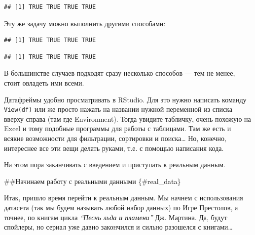 \documentclass[]{book}
\newenvironment{Shaded}{\begin{snugshade}}{\end{snugshade}}
\newcommand{\KeywordTok}[1]{\textcolor[rgb]{0.13,0.29,0.53}{\textbf{#1}}}
\newcommand{\NormalTok}[1]{#1}
\newcommand{\OperatorTok}[1]{\textcolor[rgb]{0.81,0.36,0.00}{\textbf{#1}}}
\newcommand{\StringTok}[1]{\textcolor[rgb]{0.31,0.60,0.02}{#1}}
\begin{document}
\begin{verbatim}
## [1] TRUE TRUE TRUE TRUE
\end{verbatim}

Эту же задачу можно выполнить другими способами:

\begin{Shaded}
\end{Shaded}

\begin{verbatim}
## [1] TRUE TRUE TRUE TRUE
\end{verbatim}

\begin{Shaded}
\end{Shaded}

\begin{verbatim}
## [1] TRUE TRUE TRUE TRUE
\end{verbatim}

В большинстве случаев подходят сразу несколько способов --- тем не менее, стоит овладеть ими всеми.

Датафреймы удобно просматривать в RStudio. Для это нужно написать команду \texttt{View(df)} или же просто нажать на названии нужной переменной из списка вверху справа (там где Environment). Тогда увидите табличку, очень похожую на Excel и тому подобные программы для работы с таблицами. Там же есть и всякие возможности для фильтрации, сортировки и поиска\ldots{} Но, конечно, интереснее все эти вещи делать руками, т.е. с помощью написания кода.

На этом пора заканчивать с введением и приступать к реальным данным.

\#\#Начинаем работу с реальными данными \{\#real\_data\}

Итак, пришло время перейти к реальным данным. Мы начнем с использования датасета (так мы будем называть любой набор данных) по Игре Престолов, а точнее, по книгам цикла \emph{``Песнь льда и пламени''} Дж. Мартина. Да, будут спойлеры, но сериал уже давно закончился и сильно разошелся с книгами\ldots{}
\end{document}
